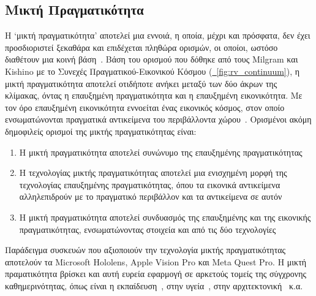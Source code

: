 \subsection{Μικτή Πραγματικότητα}\label{subsec:mixedReality}
Η `μικτή πραγματικότητα' αποτελεί μια εννοιά, η οποία, μέχρι και πρόσφατα, δεν έχει προσδιοριστεί ξεκαθάρα και επιδέχεται πληθώρα ορισμών, οι οποίοι, ωστόσο διαθέτουν μια κοινή βάση~\cite{speicher_2019_what}. Βάση του ορισμού που δόθηκε από τους Milgram και Kishino με το Συνεχές Πραγματικού-Εικονικού Κόσμου (\hyperref[fig:rv_continuum]{\schema~\ref*{fig:rv_continuum}}), η μικτή πραγματικότητα αποτελεί οτιδήποτε ανήκει μεταξύ των δύο άκρων της κλίμακας, όντας η επαυξημένη πραγματικότητα και η επαυξημένη εικονικότητα. Με τον όρο επαυξημένη εικονικότητα εννοείται ένας εικονικός κόσμος, στον οποίο ενσωματώνονται πραγματικά αντικείμενα του περιβάλλοντα χώρου~\cite{milgram_1994_augmented}. Ορισμένοι ακόμη δημοφιλείς ορισμοί της μικτής πραγματικότητας είναι:
\begin{enumerate}
    \item Η μικτή πραγματικότητα αποτελεί συνώνυμο της επαυξημένης πραγματικότητας
    \item Η τεχνολογίας μικτής πραγματικότητας αποτελεί μια ενισχημένη μορφή της τεχνολογίας επαυξημένης πραγματικότητας, όπου τα εικονικά αντικείμενα αλληλεπιδρούν με το πραγματικό περιβάλλον και τα αντικείμενα σε αυτόν
    \item Η μικτή πραγματικότητα αποτελεί συνδυασμός της επαυξημένης και της εικονικής πραγματικότητας, ενσωματώνοντας στοιχεία και από τις δύο τεχνολογίες
\end{enumerate}
Παράδειγμα συσκευών που αξιοποιούν την τεχνολογία μικτής πραγματικότητας αποτελούν τα Microsoft Hololens, Apple Vision Pro{\Large\footnotemark} και Meta Quest Pro.
Η μικτή πραματικότητα βρίσκει και αυτή ευρεία εφαρμογή σε αρκετούς τομείς της σύγχρονης καθημερινότητας, όπως είναι η εκπαίδευση~\cite{knierim_2018_challenges}\cite{liu_2007_mixed}, στην υγεία~\cite{chen_2017_recent}\cite{tepper_2017_mixed}, στην αρχιτεκτονική~\cite{wang_2008_mixed}\cite{dunston_2005_mixed} κ.α.